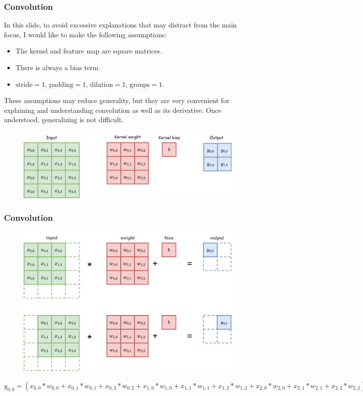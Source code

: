 \documentclass{beamer}
\begin{document}
    \begin{frame}
    	\frametitle{Convolution}
    	\justifying
    	\tiny
    	In this slide, to avoid excessive explanations that may distract from the main focus, I would like to make the following assumptions:
    	
    	\begin{itemize}
    		\item The kernel and feature map are square matrices.
    		\item There is always a bias term.
    		\item \( \text{stride} = 1 \), \( \text{padding} = 1 \), \( \text{dilation} = 1 \), \( \text{groups} = 1 \).
    	\end{itemize}
    	
    	These assumptions may reduce generality, but they are very convenient for explaining and understanding convolution as well as its derivative. Once understood, generalizing is not difficult.
    	
    	\begin{figure}
    		\centering
    		\includegraphics[width=0.8\linewidth]{src/conv.drawio (2).png}
    	\end{figure}
    \end{frame}
    
    \begin{frame}
    	\frametitle{Convolution}
    	\begin{figure}
    		\centering
    		\includegraphics[width=0.6\linewidth]{src/conv.drawio (1).png}
    	\end{figure}
    	
    	\small
    	$y_{0, 0} = (x_{0, 0}*w_{0, 0} + x_{0, 1}*w_{0, 1} + x_{0, 2}*w_{0, 2} + x_{1, 0}*w_{1, 0} + x_{1, 1}*w_{1, 1} + x_{1, 2}*w_{1, 2} + x_{2, 0}*w_{2, 0} + x_{2, 1}*w_{2, 1} + x_{2, 2}*w_{2, 2}) + b$
    \end{frame}
    
\end{document}
